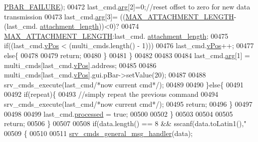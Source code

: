 \begin{DoxyCode}
      \hyperlink{a00034_aa9f43b2774395af6510910f8feed7cb4}{PBAR\_FAILURE});
00472                      last\_cmd.\hyperlink{a00001_a56e6c2d7315d0ae60a51e8b140c9cfe4}{arg}[2]=0;\textcolor{comment}{//reset offset to zero for new data transmission}
00473                      last\_cmd.\hyperlink{a00001_a56e6c2d7315d0ae60a51e8b140c9cfe4}{arg}[3]= ((\hyperlink{a00031_aa8abe3a822c64813f7aaba3ca7e3db9c}{MAX\_ATTACHMENT\_LENGTH}-(last\_cmd.
      \hyperlink{a00001_ae5afad7c81dab7d9ab6587251aafdbf4}{attachment\_length}))<0)?
00474                                           \hyperlink{a00031_aa8abe3a822c64813f7aaba3ca7e3db9c}{MAX\_ATTACHMENT\_LENGTH}:last\_cmd.
      \hyperlink{a00001_ae5afad7c81dab7d9ab6587251aafdbf4}{attachment\_length};
00475                      \textcolor{keywordflow}{if}((last\_cmd.\hyperlink{a00001_a2b48b371fd84be2a8ad581b1ad708b88}{vPos} < (multi\_cmds.length() - 1)))
00476                          last\_cmd.\hyperlink{a00001_a2b48b371fd84be2a8ad581b1ad708b88}{vPos}++;
00477                      \textcolor{keywordflow}{else}\{
00478 
00479                          \textcolor{keywordflow}{return};
00480                       \}
00481                      \}
00482 
00483 
00484                      last\_cmd.\hyperlink{a00001_a56e6c2d7315d0ae60a51e8b140c9cfe4}{arg}[1] = multi\_cmds[last\_cmd.\hyperlink{a00001_a2b48b371fd84be2a8ad581b1ad708b88}{vPos}].address;
00485 
00486                      multi\_cmds[last\_cmd.\hyperlink{a00001_a2b48b371fd84be2a8ad581b1ad708b88}{vPos}].gui.pBar->setValue(20);
00487 
00488                      srv\_cmds\_execute(last\_cmd\textcolor{comment}{/*now current cmd*/});
00489 
00490                  \}\textcolor{keywordflow}{else}\{
00491 
00492                      \textcolor{keywordflow}{if}(repeat)\{
00493                         \textcolor{comment}{//simply repeat the previous command}
00494                         srv\_cmds\_execute(last\_cmd\textcolor{comment}{/*now current cmd*/});
00495                         \textcolor{keywordflow}{return};
00496                      \}
00497 
00498 
00499                      last\_cmd.\hyperlink{a00001_a3e88f779da9798a5da7dda227e2ca388}{processed} = \textcolor{keyword}{true};
00500 
00502                  \}
00503 
00504 
00505             \textcolor{keywordflow}{return};
00506          \}
00507 
00508         \textcolor{keywordflow}{if}(data.length() == 8 && sscanf(data.toLatin1(),\textcolor{stringliteral}{"%
00509         \{
00510 
00511             \hyperlink{a00006_a8a8cd34488e8ee213350afb5b2261677}{srv\_cmds\_general\_msg\_handler}(data);
}
\end{DoxyCode}
